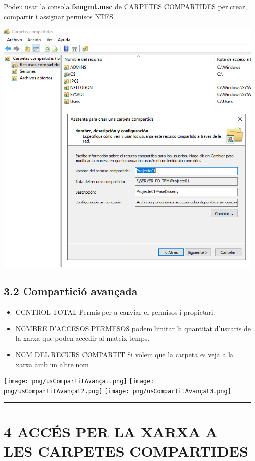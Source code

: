 \documentclass[
  a4paper,
]{article}
\begin{document}
Podeu usar la consola \textbf{fsmgmt.msc} de CARPETES COMPARTIDES per
crear, compartir i assignar permisos NTFS.

\includegraphics{png/CC1.png}

\subsection{3.2 Compartició avançada}\label{comparticiuxf3-avanuxe7ada}

\begin{itemize}
\item
  CONTROL TOTAL Permís per a canviar el permisos i propietari.
\item
  NOMBRE D'ACCESOS PERMESOS podem limitar la quantitat d'usuaris de la
  xarxa que poden accedir al mateix temps.
\item
  NOM DEL RECURS COMPARTIT Si volem que la carpeta es veja a la xarxa
  amb un altre nom
\end{itemize}

\texttt{[image: png/usCompartitAvançat.png]}
\texttt{[image: png/usCompartitAvançat2.png]}
\texttt{[image: png/usCompartitAvançat3.png]}

\begin{center}\rule{0.5\linewidth}{0.5pt}\end{center}

\section{4 ACCÉS PER LA XARXA A LES CARPETES
COMPARTIDES}\label{accuxe9s-per-la-xarxa-a-les-carpetes-compartides}
\end{document}
